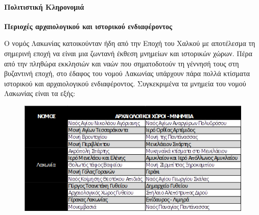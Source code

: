 \documentclass[12pt]{article}
\begin{document}
	\paragraph{Πολιτιστική Κληρονομιά}
	
	\textbf{Περιοχές αρχαιολογικού και ιστορικού ενδιαφέροντος}
	
	Ο νομός Λακωνίας κατοικούνταν ήδη από την Εποχή του Χαλκού με αποτέλεσμα τη σημερινή εποχή  να είναι μια ζωντανή έκθεση μνημείων και ιστορικών χώρων. Πέρα από την πληθώρα εκκλησιών και ναών που σηματοδοτούν τη γέννησή τους στη βυζαντινή εποχή, στο έδαφος του νομού Λακωνίας υπάρχουν πάρα πολλά κτίσματα ιστορικού και αρχαιολογικού ενδιαφέροντος. Συγκεκριμένα τα μνημεία του νομού Λακωνίας είναι τα εξής:
	
	\begin{figure} [H]
		\begin{center}
			\includegraphics [scale = 0.80] {table1.png}
		\end{center}
	\end{figure}
\end{document}
